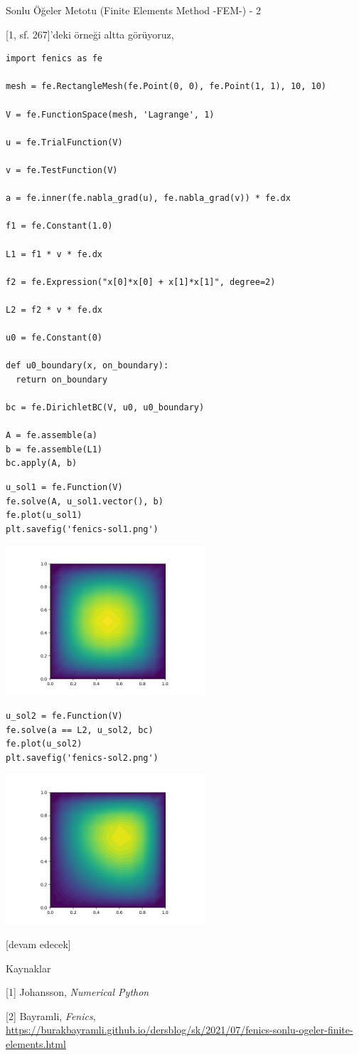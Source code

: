 \documentclass[12pt,fleqn]{article}\usepackage{../../common}
\begin{document}
Sonlu Öğeler Metotu (Finite Elements Method -FEM-) - 2

[1, sf. 267]'deki örneği altta görüyoruz,

\begin{verbatim}
import fenics as fe

mesh = fe.RectangleMesh(fe.Point(0, 0), fe.Point(1, 1), 10, 10)

V = fe.FunctionSpace(mesh, 'Lagrange', 1)

u = fe.TrialFunction(V)

v = fe.TestFunction(V)

a = fe.inner(fe.nabla_grad(u), fe.nabla_grad(v)) * fe.dx

f1 = fe.Constant(1.0)

L1 = f1 * v * fe.dx

f2 = fe.Expression("x[0]*x[0] + x[1]*x[1]", degree=2)

L2 = f2 * v * fe.dx

u0 = fe.Constant(0)

def u0_boundary(x, on_boundary):
  return on_boundary

bc = fe.DirichletBC(V, u0, u0_boundary)

A = fe.assemble(a)
b = fe.assemble(L1)
bc.apply(A, b)
\end{verbatim}

\begin{verbatim}
u_sol1 = fe.Function(V)
fe.solve(A, u_sol1.vector(), b)
fe.plot(u_sol1)
plt.savefig('fenics-sol1.png')
\end{verbatim}

\includegraphics[width=20em]{fenics-sol1.png}

\begin{verbatim}
u_sol2 = fe.Function(V)
fe.solve(a == L2, u_sol2, bc)
fe.plot(u_sol2)
plt.savefig('fenics-sol2.png')
\end{verbatim}

\includegraphics[width=20em]{fenics-sol2.png}



[devam edecek]

Kaynaklar

[1] Johansson, {\em Numerical Python}

[2] Bayramli, {\em Fenics},
    \url{https://burakbayramli.github.io/dersblog/sk/2021/07/fenics-sonlu-ogeler-finite-elements.html}
\end{document}
